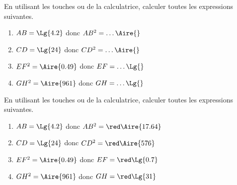 \begin{exercice*}
    \reademptyitems
    En utilisant les touches  ou \Calculatrice{//$\sqrt{\phantom{rrr}}$} de la calculatrice, calculer toutes les expressions suivantes.    
    \begin{enumerate}
        \item $AB=\Lg{4.2}$ donc $AB^2=\ldots\Aire{}$
        \item $CD=\Lg{24}$ donc $CD^2=\ldots\Aire{}$
        \item $EF^2=\Aire{0.49}$ donc $EF=\ldots\Lg{}$
        \item $GH^2=\Aire{961}$ donc $GH=\ldots\Lg{}$
    \end{enumerate}    
\end{exercice*}
\begin{corrige}
    \reademptyitems
    En utilisant les touches  ou \Calculatrice{//$\sqrt{\phantom{rrr}}$} de la calculatrice, calculer toutes les expressions suivantes.
    
    \begin{enumerate}
        \item $AB=\Lg{4.2}$ donc $AB^2={\red \Aire{17.64}}$
        \item $CD=\Lg{24}$ donc $CD^2={\red\Aire{576}}$
        \item $EF^2=\Aire{0.49}$ donc $EF={\red\Lg{0.7}}$
        \item $GH^2=\Aire{961}$ donc $GH={\red\Lg{31}}$
    \end{enumerate}  
\end{corrige}

